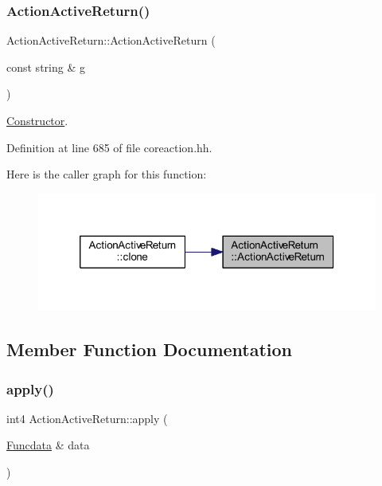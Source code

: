 \subsubsection{\texorpdfstring{ActionActiveReturn()}{ActionActiveReturn()}}
{\footnotesize\ttfamily Action\+Active\+Return\+::\+Action\+Active\+Return (\begin{DoxyParamCaption}\item[{const string \&}]{g }\end{DoxyParamCaption})\hspace{0.3cm}{\ttfamily [inline]}}



\mbox{\hyperlink{class_constructor}{Constructor}}. 



Definition at line 685 of file coreaction.\+hh.

Here is the caller graph for this function\+:
\nopagebreak
\begin{figure}[H]
\begin{center}
\leavevmode
\includegraphics[width=320pt]{class_action_active_return_a174635bc7c09d57fb7d759b4e57e7dcf_icgraph}
\end{center}
\end{figure}


\subsection{Member Function Documentation}
\mbox{\label{class_action_active_return_a69af2f49b35ac17b7e2cab3e6c0be11b}} 
\subsubsection{\texorpdfstring{apply()}{apply()}}
{\footnotesize\ttfamily int4 Action\+Active\+Return\+::apply (\begin{DoxyParamCaption}\item[{\mbox{\hyperlink{class_funcdata}{Funcdata}} \&}]{data }\end{DoxyParamCaption})\hspace{0.3cm}{\ttfamily [virtual]}}



